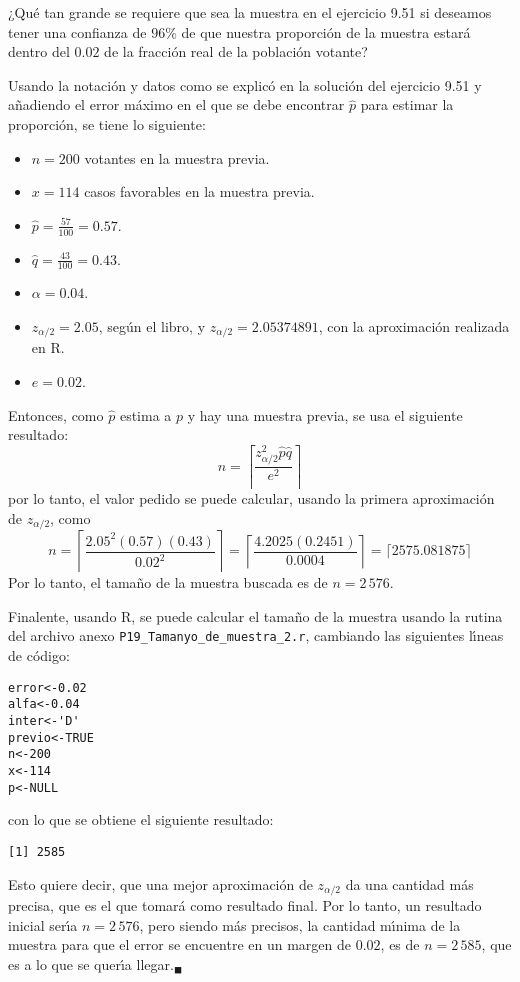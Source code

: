 \begin{enunciado}
 ¿Qu\'e tan grande se requiere que sea la muestra en el ejercicio 9.51 si deseamos tener una confianza de $96\%$ de que nuestra proporci\'on de la muestra estar\'a dentro del $0.02$ de la fracci\'on real de la poblaci\'on votante?
\end{enunciado}

\begin{solucion}
 Usando la notaci\'on y datos como se explic\'o en la soluci\'on del ejercicio 9.51 y a\~nadiendo el error m\'aximo en el que se debe encontrar $\hat{p}$ para estimar la proporci\'on, se tiene lo siguiente:
 \begin{itemize}
  \item $n=200$ votantes en la muestra previa.
  \item $x=114$ casos favorables en la muestra previa.
  \item $\hat{p} = \frac{57}{100} = 0.57$.
  \item $\hat{q} = \frac{43}{100} = 0.43$.
  \item $\alpha=0.04$.
  \item $z_{\alpha/2} = 2.05$, seg\'un el libro, y $z_{\alpha/2} = 2.05374891$, con la aproximaci\'on realizada en R.
  \item $e = 0.02$.
 \end{itemize}
 Entonces, como $\hat{p}$ estima a $p$ y hay una muestra previa, se usa el siguiente resultado:
 \begin{equation*}
  n = \left\lceil \frac{z_{\alpha/2}^2\hat{p}\hat{q}}{e^2} \right\rceil
 \end{equation*}
 por lo tanto, el valor pedido se puede calcular, usando la primera aproximaci\'on de $z_{\alpha/2}$, como
 \begin{equation*}
  n = \left\lceil \frac{2.05^2(0.57)(0.43)}{0.02^2} \right\rceil = \left\lceil \frac{4.2025(0.2451)}{0.0004} \right\rceil = \lceil 2575.081875 \rceil
 \end{equation*}
 Por lo tanto, el tama\~no de la muestra buscada es de $n = 2\,576$.
 \par 
 Finalente, usando R, se puede calcular el tama\~no de la muestra usando la rutina del archivo anexo \texttt{P19\_Tamanyo\_de\_muestra\_2.r}, cambiando las siguientes l\'{\i}neas de c\'odigo:
 \begin{verbatim}
error<-0.02
alfa<-0.04
inter<-'D'
previo<-TRUE
n<-200
x<-114
p<-NULL
 \end{verbatim}
 \vspace{-0.5cm}
 con lo que se obtiene el siguiente resultado:
 \begin{verbatim}
[1] 2585
 \end{verbatim}
 \vspace{-0.5cm}
 Esto quiere decir, que una mejor aproximaci\'on de $z_{\alpha/2}$ da una cantidad m\'as precisa, que es el que tomar\'a como resultado final. Por lo tanto, un resultado inicial ser\'{\i}a $n = 2\,576$, pero siendo m\'as precisos, la cantidad m\'{\i}nima de la muestra para que el error se encuentre en un margen de $0.02$, es de $n = 2\,585$, que es a lo que se quer\'{\i}a llegar.${}_{\blacksquare}$
\end{solucion}
